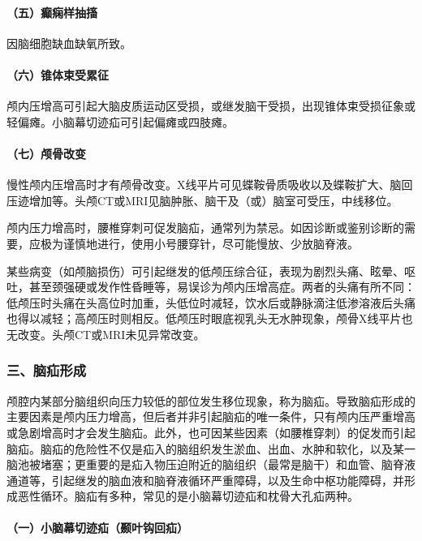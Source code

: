 \paragraph{（五）癫痫样抽搐}

因脑细胞缺血缺氧所致。

\paragraph{（六）锥体束受累征}

颅内压增高可引起大脑皮质运动区受损，或继发脑干受损，出现锥体束受损征象或轻偏瘫。小脑幕切迹疝可引起偏瘫或四肢瘫。

\paragraph{（七）颅骨改变}

慢性颅内压增高时才有颅骨改变。X线平片可见蝶鞍骨质吸收以及蝶鞍扩大、脑回压迹增加等。头颅CT或MRI见脑肿胀、脑干及（或）脑室可受压，中线移位。

颅内压力增高时，腰椎穿刺可促发脑疝，通常列为禁忌。如因诊断或鉴别诊断的需要，应极为谨慎地进行，使用小号腰穿针，尽可能慢放、少放脑脊液。

某些病变（如颅脑损伤）可引起继发的低颅压综合征，表现为剧烈头痛、眩晕、呕吐，甚至颈强硬或发作性昏睡等，易误诊为颅内压增高症。两者的头痛有所不同：低颅压时头痛在头高位时加重，头低位时减轻，饮水后或静脉滴注低渗溶液后头痛也得以减轻；高颅压时则相反。低颅压时眼底视乳头无水肿现象，颅骨X线平片也无改变。头颅CT或MRI未见异常改变。

\subsubsection{三、脑疝形成}

颅腔内某部分脑组织向压力较低的部位发生移位现象，称为脑疝。导致脑疝形成的主要因素是颅内压力增高，但后者并非引起脑疝的唯一条件，只有颅内压严重增高或急剧增高时才会发生脑疝。此外，也可因某些因素（如腰椎穿刺）的促发而引起脑疝。脑疝的危险性不仅是疝入的脑组织发生淤血、出血、水肿和软化，以及某一脑池被堵塞；更重要的是疝入物压迫附近的脑组织（最常是脑干）和血管、脑脊液通道等，引起继发的脑血液和脑脊液循环严重障碍，以及生命中枢功能障碍，并形成恶性循环。脑疝有多种，常见的是小脑幕切迹疝和枕骨大孔疝两种。

\paragraph{（一）小脑幕切迹疝（颞叶钩回疝）}

